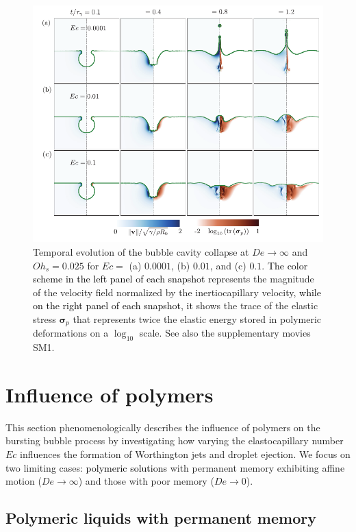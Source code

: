 \documentclass{jfm}
\newcommand{\DL}[1]{{\textcolor{black}{#1}}}
\newcommand{\AO}[1]{{\textcolor{black}{#1}}}
\newcommand{\AKD}[1]{{\textcolor{black}{#1}}}
\begin{document}
\begin{figure}
	\includegraphics[width=\textwidth]{Facets_time_Oh_HighDe_07-eps-converted-to.pdf}
	\caption{Temporal evolution of \DL{the} bubble cavity collapse at $De \to \infty$ and $Oh_s = 0.025$ for $Ec =$ (a) $0.0001$, (b) $0.01$\AKD{,} and (c) $0.1$. \AO{The color scheme in the left panel of each snapshot} represents the magnitude of the velocity field normalized by the inertiocapillary velocity, \AO{while on the right panel of each snapshot, it} shows the trace of the elastic stress $\boldsymbol{\sigma}_p$ that represents twice the elastic energy stored in polymeric deformations on a $\log_{10}$ scale. See also the supplementary movies SM1.}
	\label{facets_time_highDe}
\end{figure}

\section{Influence of polymers}
\label{sec:polymers}

This section phenomenologically describes the influence of polymers on the bursting bubble process by investigating how varying the elastocapillary number $Ec$ influences the formation of Worthington jets and droplet ejection. We focus on two limiting cases: \DL{polymeric solutions} with permanent memory exhibiting affine motion ($De \to \infty$) and those with poor memory ($De \to 0$).

\subsection{Polymeric liquids with permanent memory}
\label{sec:LargeDe}
\end{document}
